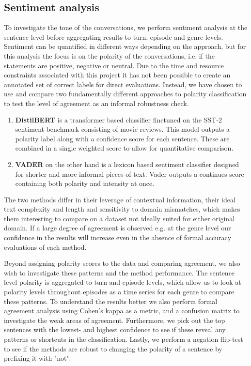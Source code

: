 \documentclass{article}
\begin{document}
\subsection{Sentiment analysis}
To investigate the tone of the conversations, we perform sentiment analysis at the sentence level before aggregating results to turn, episode and genre levels. Sentiment can be quantified in different ways depending on the approach, but for this analysis the focus is on the polarity of the conversations, i.e. if the statements are positive, negative or neutral. Due to the time and resource constraints associated with this project it has not been possible to create an annotated set of correct labels for direct evaluations. Instead, we have chosen to use and compare two fundamentally different approaches to polarity classification to test the level of agreement as an informal robustness check.
\begin{enumerate}[leftmargin=*]

\item \textbf{DistilBERT} \cite{distilbert} is a transformer based classifier finetuned on the SST-2 sentiment benchmark \cite{sst2} consisting of movie reviews. This model outputs a polarity label along with a confidence score for each sentence. These are combined in a single weighted score to allow for quantitative comparison. 

\item \textbf{VADER} \cite{vader} on the other hand is a lexicon based sentiment classifier designed for shorter and more informal pieces of text. Vader outputs a continues score containing both polarity and intensity at once. 
\end{enumerate}

The two methods differ in their leverage of contextual information, their ideal text complexity and length and sensitivity to domain mismatches, which makes them interesting to compare on a dataset not ideally suited for either original domain. If a large degree of agreement is observed e.g. at the genre level our confidence in the results will increase even in the absence of formal accuracy evaluations of each method.

Beyond assigning polarity scores to the data and comparing agreement, we also wish to investigate these patterns and the method performance. The sentence level polarity is aggregated to turn and episode levels, which allow us to look at polarity levels throughout episodes as a time series for each genre to compare these patterns. To understand the results better we also perform formal agreement analysis using Cohen's kappa as a metric, and a confusion matrix to investigate the weak areas of agreement. Furthermore, we pick out the top sentences with the lowest- and highest confidence to see if these reveal any patterns or shortcuts in the classification. Lastly, we perform a negation flip-test to see if the methods are robust to changing the polarity of a sentence by prefixing it with "not".
\end{document}
